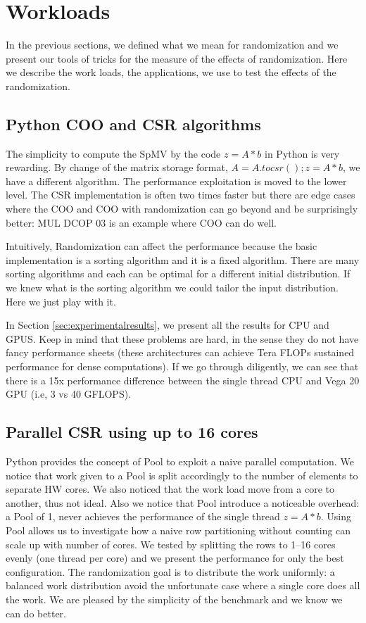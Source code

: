 \documentclass[manuscript,screen]{acmart}
\begin{document}
\section{Workloads}
\label{sec:workload}

In the previous sections, we defined what we mean for randomization
and we present our tools of tricks for the measure of the effects of
randomization. Here we describe the work loads, the applications, we
use to test the effects of the randomization.

\subsection{Python COO and CSR algorithms}
\label{sec:pythoncoocsr}
The simplicity to compute the SpMV by the code $z = A*b$ in Python is
very rewarding. By change of the matrix storage format, $A =
A.tocsr(); z = A*b$, we have a different algorithm. The performance
exploitation is moved to the lower level.  The CSR implementation is
often two times faster but there are edge cases where the COO and COO
with randomization can go beyond and be surprisingly better: MUL DCOP
03 is an example where COO can do well.

Intuitively, Randomization can affect the performance because the
basic implementation is a sorting algorithm and it is a fixed
algorithm. There are many sorting algorithms and each can be optimal
for a different initial distribution. If we knew what is the sorting
algorithm we could tailor the input distribution. Here we just play
with it.

In Section \ref{sec:experimentalresults}, we present all the results
for CPU and GPUS. Keep in mind that these problems are hard, in the
sense they do not have fancy performance sheets (these architectures
can achieve Tera FLOPs sustained performance for dense computations).
If we go through diligently, we can see that there is a 15x
performance difference between the single thread CPU and Vega 20 GPU
(i.e, 3 vs 40 GFLOPS).

\subsection{Parallel CSR using up to 16 cores}
\label{sec:parcpu}
Python provides the concept of Pool to exploit a naive parallel
computation. We notice that work given to a Pool is split accordingly
to the number of elements to separate HW cores. We also noticed that
the work load move from a core to another, thus not ideal. Also we
notice that Pool introduce a noticeable overhead: a Pool of 1, never
achieves the performance of the single thread $z = A*b$. Using Pool
allows us to investigate how a naive row partitioning without counting
can scale up with number of cores. We tested by splitting the rows to
1--16 cores evenly (one thread per core) and we present the
performance for only the best configuration. The randomization goal is to
distribute the work uniformly: a balanced work distribution avoid the
unfortunate case where a single core does all the work. We are pleased
by the simplicity of the benchmark and we know we can do better.
\end{document}
